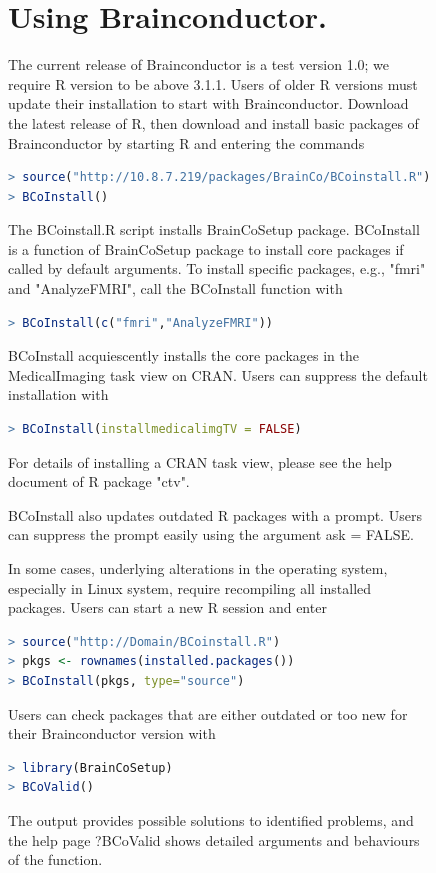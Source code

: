 \documentclass{nature}
\begin{document}
\begin{figure}[tb]
\begin{methods}
\section{Using Brainconductor.}
The current release of Brainconductor is a test version
1.0; we require R version to be above 3.1.1. Users of older R versions must
update their installation to start with Brainconductor. Download the latest
release of R, then download and install basic packages of Brainconductor by
starting R and entering the commands
\begin{lstlisting}[language = R]
> source("http://10.8.7.219/packages/BrainCo/BCoinstall.R")
> BCoInstall()
\end{lstlisting}
The BCoinstall.R script installs BrainCoSetup package. BCoInstall is a function
of BrainCoSetup package to install core packages if called by default arguments.
To install specific packages, e.g., "fmri" and "AnalyzeFMRI", call the
BCoInstall function with
\begin{lstlisting}[language = R]
> BCoInstall(c("fmri","AnalyzeFMRI"))
\end{lstlisting}
BCoInstall acquiescently installs the core packages in the MedicalImaging task
view on CRAN. Users can suppress the default installation with
\begin{lstlisting}[language = R]
> BCoInstall(installmedicalimgTV = FALSE)
\end{lstlisting}
For details of installing a CRAN task view, please see the help document of R
package "ctv".

BCoInstall also updates outdated R packages with a prompt. Users can suppress
the prompt easily using the argument ask = FALSE.

In some cases, underlying alterations in the operating system, especially in
Linux system, require recompiling all installed packages. Users can start a new
R session and enter
\begin{lstlisting}[language = R]
> source("http://Domain/BCoinstall.R")
> pkgs <- rownames(installed.packages())
> BCoInstall(pkgs, type="source")
\end{lstlisting}

Users can check packages that are either outdated or too new for their
Brainconductor version with
\begin{lstlisting}[language = R]
> library(BrainCoSetup)
> BCoValid()
\end{lstlisting}
The output provides possible solutions to identified problems, and the help page
?BCoValid shows detailed arguments and behaviours of the function.






\end{methods}
\end{figure}
\end{document}
